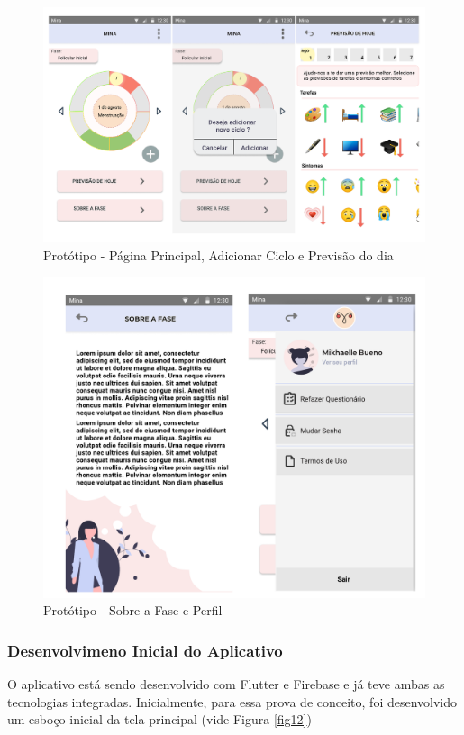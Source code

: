 \begin{figure}[h]
	\centering
	\includegraphics[keepaspectratio=true,scale=0.4]{figuras/prototipo2.pdf}
	\caption{Protótipo - Página Principal, Adicionar Ciclo e Previsão do dia}
        \label{fig10}
\end{figure}



\begin{figure}[h]
	\centering
	\includegraphics[keepaspectratio=true,scale=0.4]{figuras/prototipo3.pdf}
	\caption{Protótipo - Sobre a Fase e Perfil}
        \label{fig11}
\end{figure}


\subsubsection{Desenvolvimeno Inicial do Aplicativo}
O aplicativo está sendo desenvolvido com Flutter e Firebase e 
já teve 
ambas as tecnologias integradas. Inicialmente, para essa prova 
de conceito, 
foi desenvolvido um esboço inicial da tela principal (vide 
Figura \ref{fig12})

